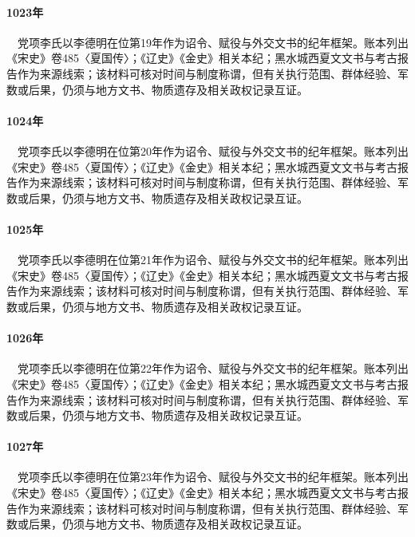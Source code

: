 \paragraph{1023年}　党项李氏以李德明在位第19年作为诏令、赋役与外交文书的纪年框架。账本列出《宋史》卷485〈夏国传〉；《辽史》《金史》相关本纪；黑水城西夏文文书与考古报告作为来源线索；该材料可核对时间与制度称谓，但有关执行范围、群体经验、军数或后果，仍须与地方文书、物质遗存及相关政权记录互证。

\paragraph{1024年}　党项李氏以李德明在位第20年作为诏令、赋役与外交文书的纪年框架。账本列出《宋史》卷485〈夏国传〉；《辽史》《金史》相关本纪；黑水城西夏文文书与考古报告作为来源线索；该材料可核对时间与制度称谓，但有关执行范围、群体经验、军数或后果，仍须与地方文书、物质遗存及相关政权记录互证。

\paragraph{1025年}　党项李氏以李德明在位第21年作为诏令、赋役与外交文书的纪年框架。账本列出《宋史》卷485〈夏国传〉；《辽史》《金史》相关本纪；黑水城西夏文文书与考古报告作为来源线索；该材料可核对时间与制度称谓，但有关执行范围、群体经验、军数或后果，仍须与地方文书、物质遗存及相关政权记录互证。

\paragraph{1026年}　党项李氏以李德明在位第22年作为诏令、赋役与外交文书的纪年框架。账本列出《宋史》卷485〈夏国传〉；《辽史》《金史》相关本纪；黑水城西夏文文书与考古报告作为来源线索；该材料可核对时间与制度称谓，但有关执行范围、群体经验、军数或后果，仍须与地方文书、物质遗存及相关政权记录互证。

\paragraph{1027年}　党项李氏以李德明在位第23年作为诏令、赋役与外交文书的纪年框架。账本列出《宋史》卷485〈夏国传〉；《辽史》《金史》相关本纪；黑水城西夏文文书与考古报告作为来源线索；该材料可核对时间与制度称谓，但有关执行范围、群体经验、军数或后果，仍须与地方文书、物质遗存及相关政权记录互证。


